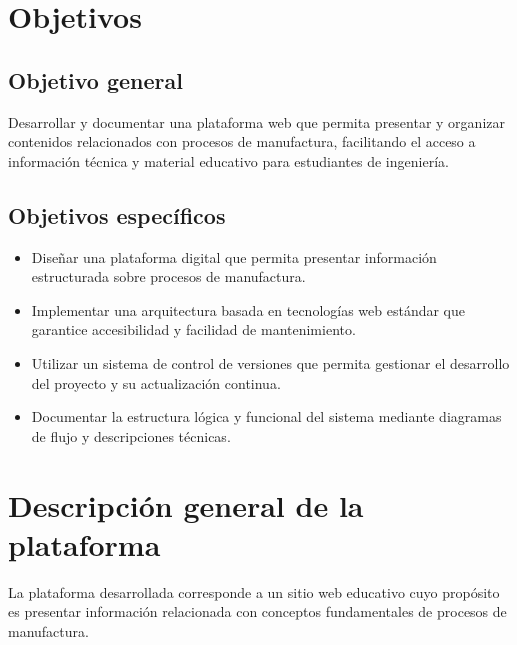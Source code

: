 \documentclass[12pt,letterpaper]{article}
\begin{document}

\section{Objetivos}

\subsection{Objetivo general}

Desarrollar y documentar una plataforma web que permita presentar y organizar contenidos relacionados con procesos de manufactura, facilitando el acceso a información técnica y material educativo para estudiantes de ingeniería.

\subsection{Objetivos específicos}

\begin{itemize}

\item Diseñar una plataforma digital que permita presentar información estructurada sobre procesos de manufactura.

\item Implementar una arquitectura basada en tecnologías web estándar que garantice accesibilidad y facilidad de mantenimiento.

\item Utilizar un sistema de control de versiones que permita gestionar el desarrollo del proyecto y su actualización continua.

\item Documentar la estructura lógica y funcional del sistema mediante diagramas de flujo y descripciones técnicas.

\end{itemize}


\section{Descripción general de la plataforma}

La plataforma desarrollada corresponde a un sitio web educativo cuyo propósito es presentar información relacionada con conceptos fundamentales de procesos de manufactura.
\end{document}
